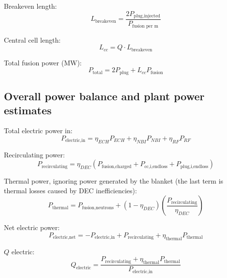 Breakeven length:
\begin{equation}
    L_{\text{breakeven}}=\frac{2P_\text{plug,injected}}{P_{\text{fusion per m}}}
\end{equation}

Central cell length:
\begin{equation}
    L_{cc} = Q \cdot L_{\text{breakeven}}
\end{equation}

Total fusion power (MW):
\begin{equation}
    P_{\text{total}} = 2P_{\text{plug}} + L_{cc}P_{\text{fusion}}
\end{equation}

\subsection{Overall power balance and plant power estimates}

Total electric power in:
\begin{equation}
    P_\text{electric,in} = \eta_{ECH} P_{ECH} + \eta_{NBI} P_{NBI} + \eta_{RF} P_{RF}
\end{equation}

Recirculating power:
\begin{equation}
    P_\text{recirculating} = \eta_{DEC} \left( P_{\text{fusion,charged}} + P_\text{cc,i,endloss} + P_\text{plug,i,endloss} \right)
\end{equation}

Thermal power, ignoring power generated by the blanket (the last term is thermal losses caused by DEC inefficiencies):
\begin{equation}
    P_\text{thermal} = P_{\text{fusion,neutrons}} + (1 - \eta_{DEC}) \left( \frac{P_\text{recirculating}}{\eta_{DEC}} \right)
\end{equation}

Net electric power:
\begin{equation}
    P_{\text{electric,net}} = - P_\text{electric,in} + P_\text{recirculating} + \eta_{\text{thermal}} P_\text{thermal}
\end{equation}

$Q$ electric:
\begin{equation}
    Q_\text{electric} = \frac{P_\text{recirculating} + \eta_{\text{thermal}}P_\text{thermal}}{P_\text{electric,in}}
\end{equation}


